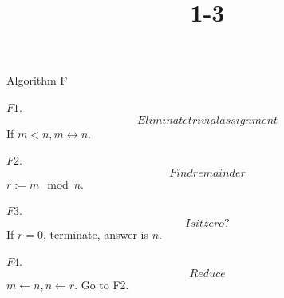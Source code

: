 \documentclass{article}
\title{1-3}
\begin{document}
\maketitle

Algorithm F

\item \( F1 \). \[ Eliminate trivial assignment \] If \( m < n, m \leftrightarrow n \).
\item \( F2 \). \[ Find remainder \] \( r := m \mod n \).
\item \( F3 \). \[ Is it zero? \] If \( r = 0 \), terminate, answer is \( n \).
\item \( F4 \). \[ Reduce \] \( m \leftarrow n, n \leftarrow r \). Go to F2.
\end{document}
